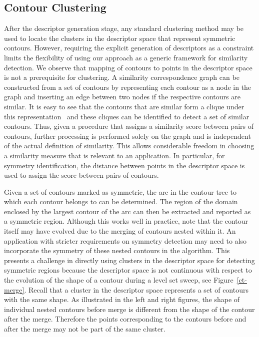 \documentclass[review,journal]{vgtc}         %
\begin{document}
\subsection{Contour Clustering}\label{clus}
After the descriptor generation stage, any standard clustering method may be used to
locate the clusters in the descriptor space that represent symmetric contours. However,
requiring the explicit generation of descriptors as a constraint limits the flexibility of 
using our approach as a generic framework for similarity detection. We observe that mapping of
contours to points in the
descriptor space is not a prerequisite for clustering. A similarity correspondence
graph can be constructed from a set of contours by representing each contour
as a node in the graph and inserting an edge between two nodes if the respective
contours are similar. It is easy to see that the contours that are similar form
a clique under this representation~\cite{Lip10} and these cliques can be identified to detect
a set of similar contours. Thus, given a procedure that assigns a similarity 
score between pairs of contours, further processing is performed 
solely on the graph and is independent of the actual definition of similarity.
This allows considerable freedom in choosing a similarity measure that is relevant to an application.
In particular, for symmetry identification, the distance between points in the descriptor space is
used to assign the score between pairs of contours. 

Given a set of contours marked as symmetric, the arc in the contour tree 
to which each contour belongs to can be determined. The region of the domain
enclosed by the largest contour of the arc can then be extracted and reported
as a symmetric region. Although this works well in practice, note that the contour
itself may have evolved due to the merging of contours nested within it.
An application with stricter requirements on symmetry detection may need to
also incorporate the symmetry of these nested contours in the algorithm. 
This presents a challenge in directly using clusters in the descriptor space 
for detecting symmetric regions because the descriptor space is not continuous with 
respect to the evolution of the shape of a contour during a level set sweep, 
see Figure~\ref{ct-merge}. Recall that a cluster in the descriptor space represents a
set of contours with the same shape. As illustrated in the left and right
figures, the shape of individual nested contours
before merge is different from the shape of the contour after the merge.
Therefore the points corresponding to the contours before and after the merge may not be
part of the same cluster. 
\end{document}
